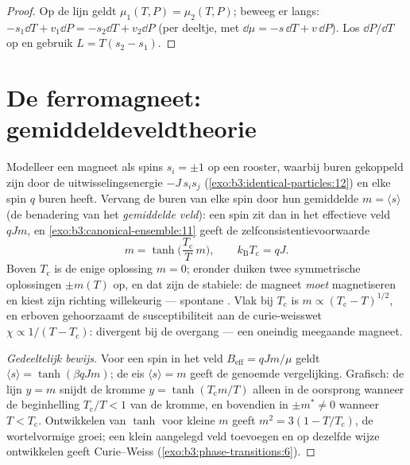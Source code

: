 \begin{proof}
Op de lijn geldt $\mu_1(T, P) = \mu_2(T, P)$; beweeg er langs:
$-s_1\dd T + v_1\dd P = -s_2\dd T + v_2\dd P$ (per deeltje, met
$\dd\mu = -s\,\dd T + v\,\dd P$). Los $\dd P/\dd T$ op en gebruik
$L = T(s_2 - s_1)$.
\end{proof}

\section{De ferromagneet: gemiddeldeveldtheorie}

\begin{theorem}\label{thm:b3:phase-transitions:meanfield}
Modelleer een magneet als spins $s_i = \pm1$ op een rooster,
waarbij buren gekoppeld zijn door de uitwisselingsenergie $-J\,s_is_j$
(\cref{exo:b3:identical-particles:12}) en elke spin $q$
buren heeft. Vervang de buren van elke spin door hun gemiddelde $m =
\langle s\rangle$ (de benadering van het \emph{gemiddelde veld}): een
spin zit dan in het effectieve veld $qJm$, en
\cref{exo:b3:canonical-ensemble:11} geeft de
zelfconsistentievoorwaarde
\[
m = \tanh\!\Big(\frac{T_{\text{c}}}{T}\,m\Big) , \qquad
k_{\text{B}}T_{\text{c}} = qJ .
\]
Boven $T_{\text{c}}$ is de enige oplossing $m = 0$; eronder duiken
twee symmetrische oplossingen $\pm m(T)$ op, en dat zijn de stabiele:
de magneet \emph{moet} magnetiseren en kiest zijn richting willekeurig
--- spontane . Vlak bij $T_{\text{c}}$ is $m \propto
(T_{\text{c}} - T)^{1/2}$, en erboven gehoorzaamt de susceptibiliteit
aan de curie-weisswet $\chi \propto 1/(T - T_{\text{c}})$:
divergent bij de overgang --- een oneindig meegaande magneet.
\end{theorem}

\begin{proof}[Gedeeltelijk bewijs]
Voor een spin in het veld $B_{\text{eff}} = qJm/\mu$ geldt $\langle s\rangle =
\tanh(\beta qJm)$; de eis $\langle s\rangle = m$ geeft de
genoemde vergelijking. Grafisch: de lijn $y = m$ snijdt de kromme $y =
\tanh(T_{\text{c}}m/T)$ alleen in de oorsprong wanneer de beginhelling
$T_{\text{c}}/T < 1$ van de kromme, en bovendien in $\pm m^* \neq 0$ wanneer
$T < T_{\text{c}}$. Ontwikkelen van $\tanh$ voor kleine
$m$ geeft $m^2 = 3(1 - T/T_{\text{c}})$, de wortelvormige groei;
een klein aangelegd veld toevoegen en op dezelfde wijze ontwikkelen geeft
Curie--Weiss (\cref{exo:b3:phase-transitions:6}).
\end{proof}

